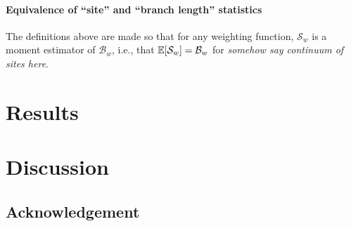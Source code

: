 \documentclass{article}
\newcommand{\branch}{\mathcal{B}} %
\newcommand{\site}{\mathcal{S}} %
\newcommand{\plr}[1]{{\color{blue} \it #1}}
\begin{document}
\paragraph{Equivalence of ``site'' and ``branch length'' statistics}
The definitions above are made so that for any weighting function,
$\site_w$ is a moment estimator of $\branch_w$, i.e.,
that $\E[\site_w] = \branch_w$ for \plr{somehow say continuum of sites here}.


\section*{Results}



\section*{Discussion}



\subsection*{Acknowledgement}



\end{document}
